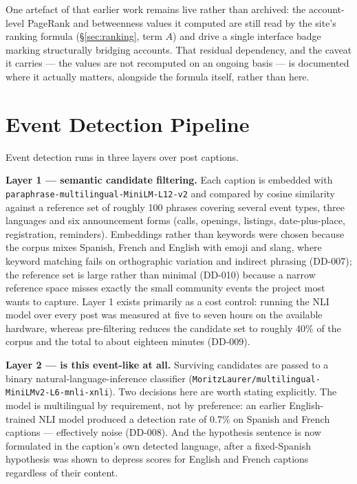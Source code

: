 \documentclass[12pt, a4paper]{report}
\begin{document}
One artefact of that earlier work remains live rather than archived: the
account-level PageRank and betweenness values it computed are still read
by the site's ranking formula (\S\ref{sec:ranking}, term $A$) and drive a
single interface badge marking structurally bridging accounts. That
residual dependency, and the caveat it carries — the values are not
recomputed on an ongoing basis — is documented where it actually matters,
alongside the formula itself, rather than here.

\section{Event Detection Pipeline}
\label{sec:event-pipeline}

Event detection runs in three layers over post captions.

\textbf{Layer 1 — semantic candidate filtering.} Each caption is embedded
with \texttt{paraphrase-multilingual-MiniLM-L12-v2} and compared by cosine
similarity against a reference set of roughly 100 phrases covering
several event types, three languages and six announcement forms (calls,
openings, listings, date-plus-place, registration, reminders). Embeddings
rather than keywords were chosen because the corpus mixes Spanish, French
and English with emoji and slang, where keyword matching fails on
orthographic variation and indirect phrasing (DD-007); the reference set
is large rather than minimal (DD-010) because a narrow reference space
misses exactly the small community events the project most wants to
capture. Layer 1 exists primarily as a cost control: running the NLI
model over every post was measured at five to seven hours on the
available hardware, whereas pre-filtering reduces the candidate set to
roughly 40\% of the corpus and the total to about eighteen minutes
(DD-009).

\textbf{Layer 2 — is this event-like at all.} Surviving candidates are
passed to a binary natural-language-inference classifier
(\texttt{MoritzLaurer/multilingual-MiniLMv2-L6-mnli-xnli}). Two
decisions here are worth stating explicitly. The model is multilingual by
requirement, not by preference: an earlier English-trained NLI model
produced a detection rate of 0.7\% on Spanish and French captions —
effectively noise (DD-008). And the hypothesis sentence is now formulated
in the caption's own detected language, after a fixed-Spanish hypothesis
was shown to depress scores for English and French captions regardless of
their content.
\end{document}
